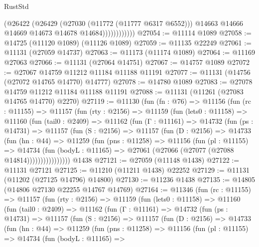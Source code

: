 \begin{lexlean}{RustStd}
\begin{coremodule}
                        (@26422
                          (@26429
                            (@27030 (@11772 (@11777 @6317 @6552)))
                            @14663
                            @14666
                            @14669
                            @14673
                            @14678
                            @14684))))))))))))
@27054 := @11114 @1089
@27058 := @14725 (@11120 @1089) (@11126 @1089)
@27059 := @11135 @22249
@27061 := @11131 (@27059 @14737)
@27063 := @11173 (@11174 @1089)
@27064 := @11169 @27063
@27066 := @11131 (@27064 @14751)
@27067 := @14757 @1089
@27072 := @27067 @14759 @11212 @11184 @11188 @11191
@27077 := @11131 (@14756 (@27072 @14765 @14770) @14777)
@27078 := @14780 @1089
@27083 := @27078 @14759 @11212 @11184 @11188 @11191
@27088 := @11131 (@11261 (@27083 @14765 @14770) @2270)
@27119 := @11130
    (fun (fn : @76) =>
    @11156
      (fun (rc : @11155) =>
      @11157
        (fun (rty : @2156) =>
        @11159
          (fun (lets0 : @11158) =>
          @11160
            (fun (tail0 : @2409) =>
            @11162
              (fun (Γ : @11161) =>
              @14732
                (fun (ps : @14731) =>
                @11157
                  (fun (S : @2156) =>
                  @11157
                    (fun (D : @2156) =>
                    @14733
                      (fun (hn : @44) =>
                      @11259
                        (fun (pns : @11258) =>
                        @11156
                          (fun (pl : @11155) =>
                          @14734
                            (fun (bodyL : @11165) =>
                            @27061 (@27066 (@27077 (@27088 @14814))))))))))))))))
    @1438
@27121 := @27059 (@11148 @1438)
@27122 := @11131 @27121
@27125 := @11210 (@11211 @1438) @22252
@27129 := @11131 (@11202 (@27125 @14796) @14800)
@27130 := @11236 @1438
@27135 := @14805 (@14806 @27130 @22255 @14767 @14769)
@27164 := @11346
    (fun (rc : @11155) =>
    @11157
      (fun (rty : @2156) =>
      @11159
        (fun (lets0 : @11158) =>
        @11160
          (fun (tail0 : @2409) =>
          @11162
            (fun (Γ : @11161) =>
            @14732
              (fun (ps : @14731) =>
              @11157
                (fun (S : @2156) =>
                @11157
                  (fun (D : @2156) =>
                  @14733
                    (fun (hn : @44) =>
                    @11259
                      (fun (pns : @11258) =>
                      @11156
                        (fun (pl : @11155) =>
                        @14734
                          (fun (bodyL : @11165) =>

\end{coremodule}
\end{lexlean}
